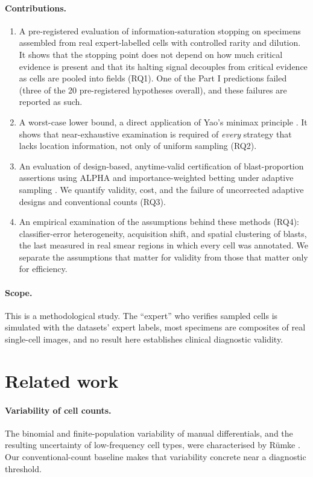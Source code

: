 \documentclass[11pt]{article}
\theoremstyle{remark}
\theoremstyle{definition}
\begin{document}
\paragraph{Contributions.}
\begin{enumerate}
\item A pre-registered evaluation of information-saturation stopping on specimens assembled from real expert-labelled cells with controlled rarity and dilution. It shows that the stopping point does not depend on how much critical evidence is present and that its halting signal decouples from critical evidence as cells are pooled into fields (RQ1). One of the Part I predictions failed (three of the 20 pre-registered hypotheses overall), and these failures are reported as such.
\item A worst-case lower bound, a direct application of Yao's minimax principle \cite{yao1977}. It shows that near-exhaustive examination is required of \emph{every} strategy that lacks location information, not only of uniform sampling (RQ2).
\item An evaluation of design-based, anytime-valid certification of blast-proportion assertions using ALPHA \cite{stark2023alpha} and importance-weighted betting under adaptive sampling \cite{shekhar2023rlfa}. We quantify validity, cost, and the failure of uncorrected adaptive designs and conventional counts (RQ3).
\item An empirical examination of the assumptions behind these methods (RQ4): classifier-error heterogeneity, acquisition shift, and spatial clustering of blasts, the last measured in real smear regions in which every cell was annotated. We separate the assumptions that matter for validity from those that matter only for efficiency.
\end{enumerate}

\paragraph{Scope.} This is a methodological study. The ``expert'' who verifies sampled cells is simulated with the datasets' expert labels, most specimens are composites of real single-cell images, and no result here establishes clinical diagnostic validity.

\section{Related work}
\paragraph{Variability of cell counts.} The binomial and finite-population variability of manual differentials, and the resulting uncertainty of low-frequency cell types, were characterised by R\"umke \cite{rumke1978}. Our conventional-count baseline makes that variability concrete near a diagnostic threshold.
\end{document}
